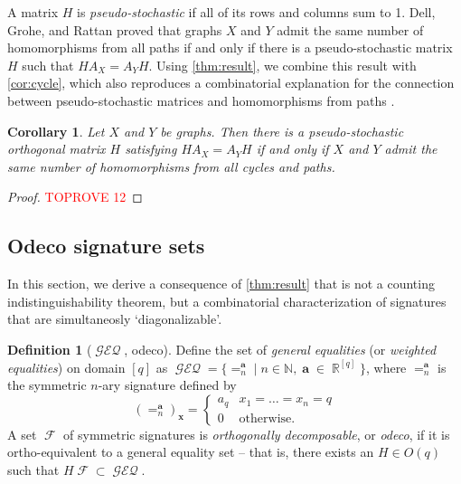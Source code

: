 \documentclass{article}
\newtheorem{corollary}{Corollary}[section]
\theoremstyle{remark}
\theoremstyle{definition}
\newtheorem{definition}{Definition}[section]
\DeclareMathOperator{\rr}{\mathbb{R}}
\DeclareMathOperator{\vx}{\mathbf{x}}
\DeclareMathOperator{\va}{\mathbf{a}}
\DeclareMathOperator{\fc}{\mathcal{F}}
\DeclareMathOperator{\geneq}{\mathcal{GEQ}}
\begin{document}
A matrix $H$ is \emph{pseudo-stochastic} if all of its rows and columns sum to 1. Dell, Grohe, and
Rattan \cite{dell} proved that graphs $X$ and $Y$ admit the same number of homomorphisms from all
paths if and only if there is a pseudo-stochastic matrix $H$ such that $HA_X = A_YH$. 
Using \autoref{thm:result}, we combine this result with \autoref{cor:cycle}, which also
reproduces a combinatorial explanation 
for the connection between pseudo-stochastic matrices and homomorphisms from paths 
\cite{grohe_homomorphism_2022}.
\begin{corollary}
    Let $X$ and $Y$ be graphs. Then there is a pseudo-stochastic orthogonal matrix $H$ satisfying 
    $H A_X = A_Y H$
    if and only if $X$ and $Y$ admit the same number of homomorphisms from all cycles and paths.
\end{corollary}
\begin{proof}\textcolor{red}{TOPROVE 12}\end{proof}

\subsection{Odeco signature sets}
In this section, we derive a consequence of \autoref{thm:result} that is not a counting
indistinguishability theorem,
but a combinatorial characterization of signatures that are simultaneosly `diagonalizable'.
\begin{definition}[$\geneq$, odeco]
    Define the set of \emph{general equalities} (or \emph{weighted equalities}) on domain $[q]$ as
    $\geneq = \{=_n^{\va} \mid n \in \mathbb{N}, \va \in \rr^{[q]}\}$, where $=_n^{\va}$ is the symmetric
    $n$-ary signature defined by
    \[
        (=_n^{\va})_{\vx} = \begin{cases} a_q & x_1 = \ldots = x_n = q \\ 0 & \text{otherwise}.
        \end{cases}
    \]
    A set $\fc$ of symmetric signatures is \emph{orthogonally decomposable}, or \emph{odeco}, if it is ortho-equivalent
    to a general equality set -- that is, there exists an $H \in O(q)$ such that $H\fc \subset \geneq$.
\end{definition}
\end{document}
